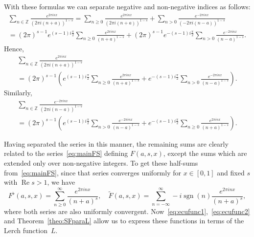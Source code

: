 \documentclass[11pt,a4paper,reqno]{amsart}
\newcommand{\Z}{\mathbb{Z}}
\let\tilde\widetilde
\renewcommand{\Re}{\operatorname{Re}}
\newcommand{\sgn}{\operatorname{sgn}}
\theoremstyle{plain}
\theoremstyle{remark}
\numberwithin{equation}{section}
\begin{document}
With these formulas we can separate negative and non-negative indices as follows:
\begin{multline*}
  \sum_{n\in\Z} \frac{e^{2\pi inx}}{(2\pi i(n+a))^{1-s}}
  = \sum_{n\geq 0} \frac{e^{2\pi inx}}{(2\pi i(n+a))^{1-s}}
  + \sum_{n>0}\frac{e^{-2\pi inx}}{(-2\pi i(n-a))^{1-s}}
  \\
  = (2\pi)^{s-1}e^{(s-1)i \frac{\pi}{2}} \sum_{n\geq 0}\frac{e^{2\pi inx}}{(n+a)^{1-s}}
  + (2\pi)^{s-1}e^{-(s-1)i\frac{\pi}{2}} \sum_{n> 0}\frac{e^{-2\pi inx}}{(n-a)^{1-s}}.
\end{multline*}
Hence,
\begin{multline}
\label{eq:ecufunc1}
  \sum_{n\in\Z} \frac{e^{2\pi inx}}{(2\pi i(n+a))^{1-s}}
  \\
  = (2\pi)^{s-1} \left( e^{(s-1)i\frac{\pi}{2}} \sum_{n\geq 0}
  \frac{e^{2\pi inx}}{(n+a)^{1-s}} + e^{-(s-1)i\frac{\pi}{2}}
  \sum_{n> 0} \frac{e^{-2\pi inx}}{(n-a)^{1-s}}\right).
\end{multline}
Similarly,
\begin{multline}
  \label{eq:ecufunc2}
  \sum_{n\in\Z}\frac{e^{-2\pi inx}}{(2\pi i(n-a))^{1-s}}
  \\
  = (2\pi)^{s-1} \left( e^{(s-1)i\frac{\pi}{2}}
  \sum_{n> 0} \frac{e^{-2\pi inx}}{(n-a)^{1-s}}
  + e^{-(s-1)i\frac{\pi}{2}} \sum_{n\geq 0}
  \frac{e^{2\pi inx}}{(n+a)^{1-s}}\right).
\end{multline}

Having separated the series in this manner, the remaining sums are clearly related to the series~\eqref{eq:mainFS} defining $F(a,s,x)$, except the sums which are extended only over non-negative integers. To get these half-sums from~\eqref{eq:mainFS}, 
since that series converges uniformly for $x \in [0,1]$ and fixed $s$ with $\Re s > 1$, we have
\begin{equation*}
  F^\flat(a,s,x) = \sum_{n\geq 0}^\infty\frac{e^{2\pi i nx}}{(n+a)^s},
  \quad \tilde{F}(a,s,x) = \sum_{n=-\infty}^\infty -i\sgn(n) \frac{e^{2\pi i nx}}{(n+a)^s},
\end{equation*}
where both series are also uniformly convergent. Now~\eqref{eq:ecufunc1},~\eqref{eq:ecufunc2} and Theorem~\ref{theo:SFparaL} allow us to express these functions in terms of the Lerch function~$L$.
\end{document}
